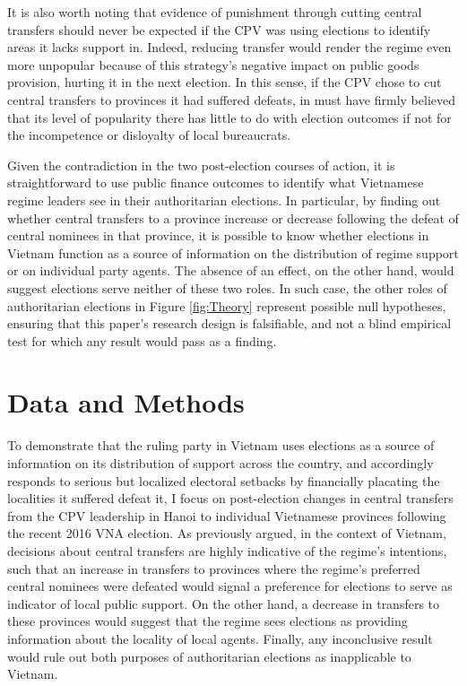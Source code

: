 \documentclass[12pt]{article}
\newcommand{\1}{\mathbbm{1}}
\begin{document}
It is also worth noting that evidence of punishment through cutting central transfers should never be expected if the CPV was using elections to identify areas it lacks support in. Indeed, reducing transfer would render the regime even more unpopular because of this strategy's negative impact on public goods provision, hurting it in the next election. In this sense, if the CPV chose to cut central transfers to provinces it had suffered defeats, in must have firmly believed that its level of popularity there has little to do with election outcomes if not for the incompetence or disloyalty of local bureaucrats.

Given the contradiction in the two post-election courses of action, it is straightforward to use public finance outcomes to identify what Vietnamese regime leaders see in their authoritarian elections. In particular, by finding out whether central transfers to a province increase or decrease following the defeat of central nominees in that province, it is possible to know whether elections in Vietnam function as a source of information on the distribution of regime support or on individual party agents. The absence of an effect, on the other hand, would suggest elections serve neither of these two roles. In such case, the other roles of authoritarian elections in Figure \ref{fig:Theory} represent possible null hypotheses, ensuring that this paper's research design is falsifiable, and not a blind empirical test for which any result would pass as a finding.

\section{Data and Methods}
\label{sec:methods}

To demonstrate that the ruling party in Vietnam uses elections as a source of information on its distribution of support across the country, and accordingly responds to serious but localized electoral setbacks by financially placating the localities it suffered defeat it, I focus on post-election changes in central transfers from the CPV leadership in Hanoi to individual Vietnamese provinces following the recent 2016 VNA election. As previously argued, in the context of Vietnam, decisions about central transfers are highly indicative of the regime's intentions, such that an increase in transfers to provinces where the regime's preferred central nominees were defeated would signal a preference for elections to serve as indicator of local public support. On the other hand, a decrease in transfers to these provinces would suggest that the regime sees elections as providing information about the locality of local agents. Finally, any inconclusive result would rule out both purposes of authoritarian elections as inapplicable to Vietnam.
\end{document}
